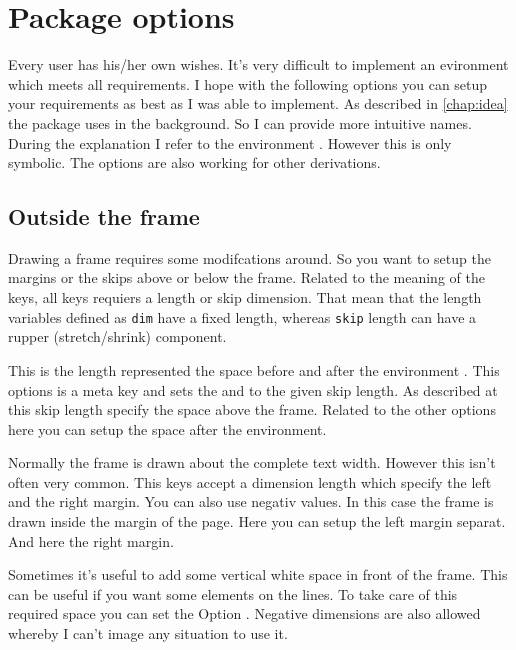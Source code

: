 \documentclass[openany,12pt,tocdepth=3]{ltx-md}
\begin{document}
\chapter{Package options}\label{chap:options}
Every user has his/her own wishes. It's very difficult to implement an evironment 
which meets all requirements. I hope with the following options you can setup your 
requirements as best as I was able to implement. As described in \autoref{chap:idea}
the package uses  in the background. So I can provide more intuitive names.
During the explanation I refer to the environment . However this is only
symbolic. The options are also working for other derivations. 

\section{Outside the frame}
Drawing a frame requires some modifcations around. So you want to setup the margins
or the skips above or below the frame. Related to the meaning of the keys, all keys 
requiers a length or skip dimension. That mean that the length variables defined as
\texttt{dim} have a fixed length, whereas \texttt{skip} length can have a rupper (stretch/shrink) component. 

This is the length represented the space before and after the environment .  
This options is a meta key and sets the  and  to the given skip length. 
As described at  this skip length specify the space above the frame.
Related to the other options here you can setup the space after the environment.


Normally the frame  is drawn about the complete text width. However this isn't
often very common. This keys accept a dimension length which specify the left and the right margin.
You can also use negativ values. In this case the frame is drawn inside the margin of the page.
Here you can setup the left margin separat. 
And here the right margin. 

Sometimes it's useful to add some vertical white space in front of the frame. This can be useful
if you want some elements on the lines. To take care of this required space you can
set the Option . Negative dimensions are also allowed whereby I can't
image any situation to use it. 
\end{document}
